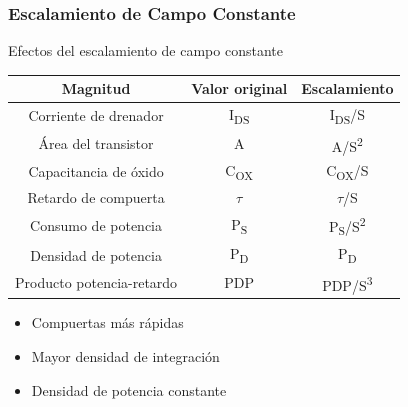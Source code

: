 \documentclass[t,aspectratio=169,10pt]{beamer}
\begin{document}
\begin{frame}
\frametitle{Escalamiento de Campo Constante}
\centering
Efectos del escalamiento de campo constante

\vspace{5mm}
\begin{tabular}{|c|c|c|}
	\hline \textbf{Magnitud} & \textbf{Valor original} & \textbf{Escalamiento} \\
	\hline Corriente de drenador & I\textsubscript{DS} & I\textsubscript{DS}/S\\
	\hline Área del transistor & A & A/S\textsuperscript{2} \\
	\hline Capacitancia de óxido & C\textsubscript{OX} & C\textsubscript{OX}/S \\
	\hline Retardo de compuerta & $\tau$ & $\tau$/S \\
	\hline Consumo de potencia & P\textsubscript{S} & P\textsubscript{S}/S\textsuperscript{2} \\
	\hline Densidad de potencia & P\textsubscript{D} & P\textsubscript{D} \\
	\hline Producto potencia-retardo & PDP & PDP/S\textsuperscript{3} \\
	\hline
\end{tabular}

\vspace{5mm}
\begin{itemize}
	\item Compuertas más rápidas
	\item Mayor densidad de integración
	\item Densidad de potencia constante
\end{itemize}
\end{frame}
\end{document}
